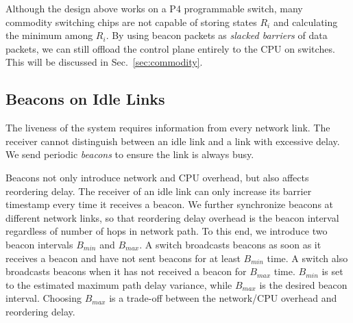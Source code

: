Although the design above works on a P4 programmable switch, many commodity switching chips are  not capable of storing states $R_i$ and calculating the minimum among $R_i$.
By using beacon packets as \textit{slacked barriers} of data packets, we can still offload the control plane entirely to the CPU on switches.
This will be discussed in Sec.~\ref{sec:commodity}.

\subsection{Beacons on Idle Links}
\label{sec:beacon}

The liveness of the system requires information from every network link.
The receiver cannot distinguish between an idle link and a link with excessive delay.
We send periodic \textit{beacons} to ensure the link is always busy.


Beacons not only introduce network and CPU overhead, but also affects reordering delay.
The receiver of an idle link can only increase its barrier timestamp every time it receives a beacon.
We further synchronize beacons at different network links, so that reordering delay overhead is the beacon interval regardless of number of hops in network path.
To this end, we introduce two beacon intervals $B_{min}$ and $B_{max}$.
A switch broadcasts beacons as soon as it receives a beacon and have not sent beacons for at least $B_{min}$ time.
A switch also broadcasts beacons when it has not received a beacon for $B_{max}$ time.
$B_{min}$ is set to the estimated maximum path delay variance, while $B_{max}$ is the desired beacon interval.
Choosing $B_{max}$ is a trade-off between the network/CPU overhead and reordering delay.


